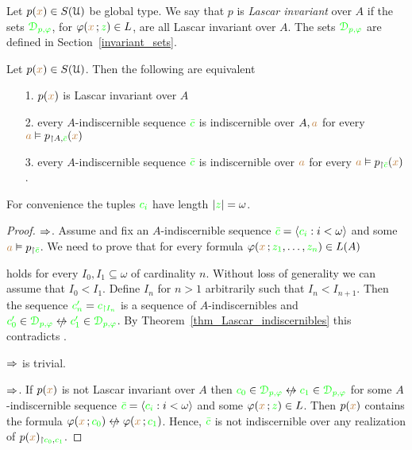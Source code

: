Let $p({\color{brown} x})\in S(\EuScript U)$ be global type.
We say that $p$ is \emph{Lascar invariant\/} over $A$ if the sets ${\color{green}\EuScript D_{p,\varphi}}$, for $\varphi({\color{brown} x}\,;{\color{green} z})\in L$, are all Lascar invariant over $A$.
The sets ${\color{green}\EuScript D_{p,\varphi}}$ are defined in Section~\ref{invariant_sets}.

\begin{proposition}\label{prop_Lascar_indiscernibles}
  Let $p({\color{brown} x})\in S(\EuScript U)$.
  Then the following are equivalent
  \begin{itemize}
    \item[1.] $p({\color{brown} x})$ is Lascar invariant over $A$
    \item[2.] every $A$-indiscernible sequence ${\color{green}\bar c}$ is indiscernible over $A,{\color{brown} a}$ for every ${\color{brown} a}\vDash p_{\restriction A,{\color{green}\bar c}}({\color{brown} x})$
    \item[3.] every $A$-indiscernible sequence ${\color{green}\bar c}$ is indiscernible over ${\color{brown} a}$ for every ${\color{brown} a}\vDash p_{\restriction {\color{green}\bar c}}({\color{brown} x})$.
  \end{itemize}
  For convenience the tuples ${\color{green} c_i}$ have length $|{\color{green} z}|=\omega$.
\end{proposition}
\begin{proof} $\Rightarrow$.
Assume  and fix an $A$-indiscernible sequence ${\color{green}\bar c}=\langle{\color{green}c_i}:i<\omega\rangle$ and some ${\color{brown} a}\vDash p_{\restriction{\color{green}\bar c}}$.
  We need to prove that for every formula $\varphi({\color{brown} x}\,;{\color{green} z_1},\dots,{\color{green} z_n})\in L(A)$


  holds for every $I_0,I_1\subseteq\omega$ of cardinality $n$.
  Without loss of generality we can assume that $I_0<I_1$.
  Define $I_n$ for $n>1$ arbitrarily such that $I_n<I_{n+1}$.
  Then the sequence ${\color{green} c'_n}={\color{green} c_{\restriction I_n}}$ is a sequence of $A$-in\-dis\-cern\-i\-bles and ${\gr c'_0}\in{\gr\D_{p,\phi}}\niff {\gr c'_1}\in{\gr\D_{p,\phi}}$.
  By Theorem~\ref{thm_Lascar_indiscernibles} this contradicts .
  
  $\Rightarrow$ is trivial.

  $\Rightarrow$.
  If $p({\color{brown} x})$ is not Lascar invariant over $A$ then ${\gr c_0}\in{\gr\D_{p,\phi}}\niff {\gr c_1}\in{\gr\D_{p,\phi}}$ for some $A$-indiscernible sequence ${\color{green}\bar c}=\langle{\color{green}c_i}:i<\omega\rangle$ and some $\varphi({\color{brown} x}\,;{\color{green} z})\in L$.
  Then $p({\color{brown} x})$ contains the formula $\phi({\mr x}\,;{\gr c_0})\niff \phi({\mr x}\,;{\gr c_1})$.
  Hence, ${\color{green}\bar c}$ is not indiscernible over any realization of $p({\color{brown} x})_{\restriction{\color{green}c_0},{\color{green} c_1}}$.
\end{proof}

